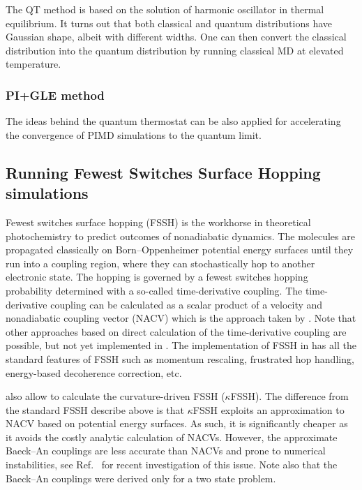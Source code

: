 The QT method is based on the solution of harmonic oscillator in thermal equilibrium. 
It turns out that both classical and quantum distributions have Gaussian shape, albeit with different widths. One can then convert the classical distribution into the quantum distribution
by running classical MD at elevated temperature.



\subsubsection{PI+GLE method}
The ideas behind the quantum thermostat can be also applied for accelerating the convergence of PIMD simulations to the quantum limit.  


\subsection{Running Fewest Switches Surface Hopping simulations}
Fewest switches surface hopping (FSSH) is the workhorse in theoretical photochemistry to predict outcomes of nonadiabatic dynamics. The molecules are propagated classically on Born--Oppenheimer potential energy surfaces until they run into a coupling region, where they can stochastically hop to another electronic state. The hopping is governed by a fewest switches hopping probability determined with a so-called time-derivative coupling. The time-derivative coupling can be calculated as a scalar product of a velocity and nonadiabatic coupling vector (NACV) which is the approach taken by \abin. Note that other approaches based on direct calculation of the time-derivative coupling are possible, but not yet implemented in \abin.
The implementation of FSSH in \abin has all the standard features of FSSH such as momentum rescaling, frustrated hop handling, energy-based decoherence correction\cite{Granucci2007}, etc.  

\abin also allow to calculate the curvature-driven FSSH ($\kappa$FSSH)\cite{Jira2025}. The difference from the standard FSSH describe above is that $\kappa$FSSH exploits an approximation to NACV based on potential energy surfaces. As such, it is significantly cheaper as it avoids the costly analytic calculation of NACVs. However, the approximate Baeck--An couplings are less accurate than NACVs and prone to numerical instabilities, see Ref.~ for recent investigation of this issue. Note also that the Baeck--An couplings were derived only for a two state problem.

